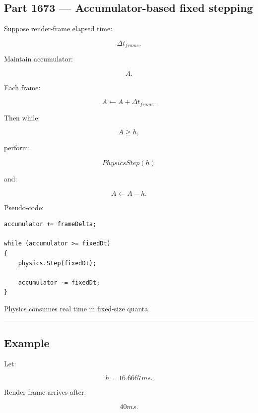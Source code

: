 \subsection{Part 1673 --- Accumulator-based fixed stepping}\label{06-engine-ii-ch037-part-1673-accumulator-based-fixed-stepping}

\hypertarget{06-engine-ii-ch037-part-1673-accumulator-based-fixed-stepping}{}

Suppose render-frame elapsed time:

\[
\Delta t_{frame}.
\]

Maintain accumulator:

\[
A.
\]

Each frame:

\[
A\leftarrow A+\Delta t_{frame}.
\]

Then while:

\[
A\ge h,
\]

perform:

\[
PhysicsStep(h)
\]

and:

\[
A\leftarrow A-h.
\]

Pseudo-code:

\begin{verbatim}
accumulator += frameDelta;

while (accumulator >= fixedDt)
{
    physics.Step(fixedDt);

    accumulator -= fixedDt;
}
\end{verbatim}

Physics consumes real time in fixed-size quanta.

\begin{center}\rule{0.5\linewidth}{0.5pt}\end{center}

\begin{allmightroleexample}

\subsection{Example}\label{06-engine-ii-ch037-example}

\hypertarget{06-engine-ii-ch037-example}{}

Let:

\end{allmightroleexample}

\[
h=16.6667ms.
\]

Render frame arrives after:

\[
40ms.
\]

